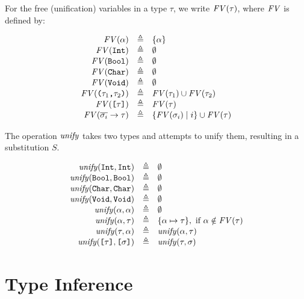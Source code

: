 For the free (unification) variables in a type $\tau$, we write $\mathit{FV}(\tau)$, where
$\mathit{FV}$ is defined by:

\[
\begin{array}{rcl}
  \mathit{FV}(\alpha) & \triangleq & \{ \alpha \} \\
  \mathit{FV}(\texttt{Int}) & \triangleq & \emptyset \\
  \mathit{FV}(\texttt{Bool}) & \triangleq & \emptyset \\
  \mathit{FV}(\texttt{Char}) & \triangleq & \emptyset \\
  \mathit{FV}(\texttt{Void}) & \triangleq & \emptyset \\
  \mathit{FV}( \texttt{(}\tau_1\texttt{,}\tau_2\texttt{)} ) & \triangleq & \mathit{FV}(\tau_1) \cup \mathit{FV}(\tau_2) \\
  \mathit{FV}( \texttt{[}\tau\texttt{]} ) & \triangleq & \mathit{FV}(\tau) \\
  \mathit{FV}( \overline{\sigma_i} \to \tau ) & \triangleq & \{ \mathit{FV}(\sigma_i) \mid i \} \cup \mathit{FV}(\tau)
\end{array}
\]

The operation $\mathit{unify}$ takes two types and attempts to unify them, resulting in
a substitution $S$.

\[
\begin{array}{rcl}
  \mathit{unify}(\texttt{Int},\texttt{Int}) & \triangleq & \emptyset \\
  \mathit{unify}(\texttt{Bool},\texttt{Bool}) & \triangleq & \emptyset \\
  \mathit{unify}(\texttt{Char},\texttt{Char}) & \triangleq & \emptyset \\
  \mathit{unify}(\texttt{Void},\texttt{Void}) & \triangleq & \emptyset \\
  \mathit{unify}(\alpha,\alpha) & \triangleq & \emptyset \\
  \mathit{unify}(\alpha,\tau) & \triangleq &
    \{ \alpha \mapsto \tau \},\ \text{if}\ \alpha \notin \mathit{FV}(\tau) \\
  \mathit{unify}(\tau,\alpha) & \triangleq & \mathit{unify}(\alpha,\tau) \\
  \mathit{unify}(\texttt{[}\tau\texttt{]},\texttt{[}\sigma\texttt{]}) & \triangleq & \mathit{unify}(\tau,\sigma)
\end{array}
\]


\section{Type Inference}

